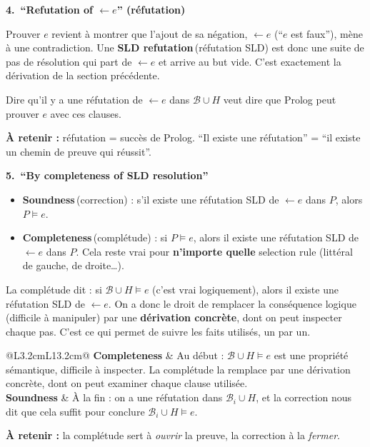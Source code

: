 \documentclass[10pt]{article}
\newcommand{\EN}[2]{\textbf{#1}\,{\scriptsize\textcolor{marine}{(#2)}}}
\newcommand{\titrebox}[2]{\needspace{10\baselineskip}\vspace{8pt}
  \begin{tcolorbox}[colback=marine, colframe=marine, arc=0pt, boxrule=0pt,
    top=4pt, bottom=4pt, left=8pt]
  \color{white}\Large\bfseries #1.~#2
  \end{tcolorbox}\vspace{2pt}}
\newcommand{\ce}[1]{\begin{pourquoi}\textbf{\textcolor{marine}{À retenir :}} #1\end{pourquoi}}
\newcommand{\st}[1]{\par\needspace{7\baselineskip}\vspace{5pt}{\normalsize\bfseries\textcolor{marine}{#1}}\par\vspace{2pt}}
\begin{document}
\titrebox{4}{``Refutation of $\leftarrow e$'' (réfutation)}
Prouver $e$ revient à montrer que l'ajout de sa négation, $\leftarrow e$ (``$e$ est faux''), mène à une
contradiction. Une \EN{SLD refutation}{réfutation SLD} est donc une suite de pas de résolution qui part de
$\leftarrow e$ et arrive au but vide. C'est exactement la dérivation de la section précédente.\par\vspace{3pt}
Dire qu'il y a une réfutation de $\leftarrow e$ dans $\mathcal{B}\cup H$ veut dire que Prolog peut prouver $e$
avec ces clauses.
\ce{réfutation = succès de Prolog. ``Il existe une réfutation'' = ``il existe un chemin de preuve qui réussit''.}

\titrebox{5}{``By completeness of SLD resolution''}
\st{Completeness (complétude) et soundness (correction)}
\begin{itemize}
  \item \EN{Soundness}{correction} : s'il existe une réfutation SLD de $\leftarrow e$ dans $P$, alors $P\models e$.
  \item \EN{Completeness}{complétude} : si $P\models e$, alors il existe une réfutation SLD de $\leftarrow e$ dans $P$.
        Cela reste vrai pour \textbf{n'importe quelle} selection rule (littéral de gauche, de droite\ldots).
\end{itemize}
La complétude dit : si $\mathcal{B}\cup H\models e$ (c'est vrai logiquement), alors il existe une réfutation
SLD de $\leftarrow e$. On a donc le droit de remplacer la conséquence logique (difficile à manipuler) par une
\textbf{dérivation concrète}, dont on peut inspecter chaque pas. C'est ce qui permet de suivre les faits
utilisés, un par un.

\st{Où on s'en sert dans la preuve}
\begin{tabular}{@{}L{3.2cm}L{13.2cm}@{}}
\textbf{Completeness} & Au début : $\mathcal{B}\cup H\models e$ est une propriété sémantique, difficile à inspecter. La complétude la remplace par une dérivation concrète, dont on peut examiner chaque clause utilisée.\\[3pt]
\textbf{Soundness} & À la fin : on a une réfutation dans $\mathcal{B}_i\cup H$, et la correction nous dit que cela suffit pour conclure $\mathcal{B}_i\cup H\models e$.\\
\end{tabular}
\ce{la complétude sert à \emph{ouvrir} la preuve, la correction à la \emph{fermer}.}
\end{document}
